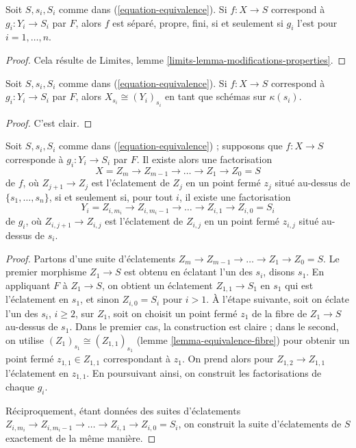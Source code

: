 \begin{lemma} \label{lemma-equivalence-properties} Soit $S, s_i, S_i$ comme dans (\ref{equation-equivalence}). Si $f : X \to S$ correspond à $g_i : Y_i \to S_i$ par $F$, alors $f$ est séparé, propre, fini, si et seulement si $g_i$ l'est pour $i = 1, \ldots, n$. \end{lemma}

\begin{proof} Cela résulte de Limites, lemme \ref{limits-lemma-modifications-properties}. \end{proof}

\begin{lemma} \label{lemma-equivalence-fibre} Soit $S, s_i, S_i$ comme dans (\ref{equation-equivalence}). Si $f : X \to S$ correspond à $g_i : Y_i \to S_i$ par $F$, alors $X_{s_i} \cong (Y_i)_{s_i}$ en tant que schémas sur $\kappa(s_i)$. \end{lemma}

\begin{proof} C'est clair. \end{proof}

\begin{lemma} \label{lemma-equivalence-sequence-blowups} Soit $S, s_i, S_i$ comme dans (\ref{equation-equivalence}) ; supposons que $f : X \to S$ corresponde à $g_i : Y_i \to S_i$ par $F$. Il existe alors une factorisation $$
X = Z_m \to Z_{m - 1} \to \ldots \to Z_1 \to Z_0 = S
$$ de $f$, où $Z_{j + 1} \to Z_j$ est l'éclatement de $Z_j$ en un point fermé $z_j$ situé au-dessus de $\{s_1, \ldots, s_n\}$, si et seulement si, pour tout $i$, il existe une factorisation $$
Y_i = Z_{i, m_i} \to Z_{i, m_i - 1} \to \ldots \to Z_{i, 1} \to Z_{i, 0} = S_i
$$ de $g_i$, où $Z_{i, j + 1} \to Z_{i, j}$ est l'éclatement de $Z_{i, j}$ en un point fermé $z_{i, j}$ situé au-dessus de $s_i$. \end{lemma}

\begin{proof} Partons d'une suite d'éclatements $Z_m \to Z_{m - 1} \to \ldots \to Z_1 \to Z_0 = S$. Le premier morphisme $Z_1 \to S$ est obtenu en éclatant l'un des $s_i$, disons $s_1$. En appliquant $F$ à $Z_1 \to S$, on obtient un éclatement $Z_{1, 1} \to S_1$ en $s_1$ qui est l'éclatement en $s_1$, et sinon $Z_{i, 0} = S_i$ pour $i > 1$. À l'étape suivante, soit on éclate l'un des $s_i$, $i \geq 2$, sur $Z_1$, soit on choisit un point fermé $z_1$ de la fibre de $Z_1 \to S$ au-dessus de $s_1$. Dans le premier cas, la construction est claire ; dans le second, on utilise $(Z_1)_{s_1} \cong (Z_{1, 1})_{s_1}$ (lemme \ref{lemma-equivalence-fibre}) pour obtenir un point fermé $z_{1, 1} \in Z_{1, 1}$ correspondant à $z_1$. On prend alors pour $Z_{1, 2} \to Z_{1, 1}$ l'éclatement en $z_{1, 1}$. En poursuivant ainsi, on construit les factorisations de chaque $g_i$.

\medskip\noindent Réciproquement, étant données des suites d'éclatements $Z_{i, m_i} \to Z_{i, m_i - 1} \to \ldots \to Z_{i, 1} \to Z_{i, 0} = S_i$, on construit la suite d'éclatements de $S$ exactement de la même manière. \end{proof}

